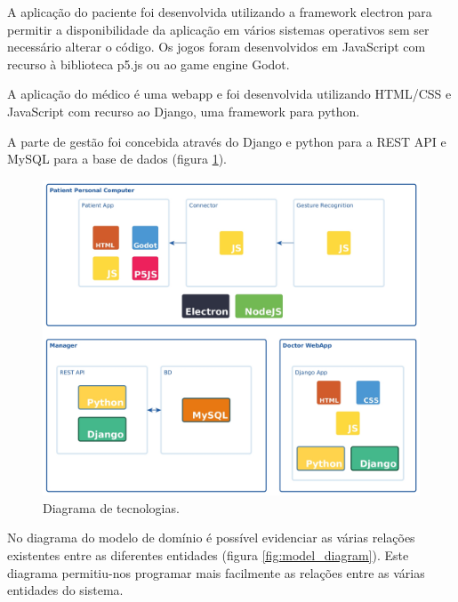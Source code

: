 \documentclass{TTUPhD}
\begin{document}
A aplicação do paciente foi desenvolvida utilizando a framework electron para permitir a disponibilidade da aplicação em vários sistemas operativos sem ser necessário
alterar o código.
Os jogos foram desenvolvidos em JavaScript com recurso à biblioteca p5.js ou ao game engine Godot.

A aplicação do médico é uma webapp e foi desenvolvida utilizando HTML/CSS e JavaScript com recurso ao Django, uma framework para python.

A parte de gestão foi concebida através do Django e python para a REST API e MySQL para a base de dados (figura \ref{fig:tech_diagram}).

\begin{figure}[h!]
    \center
    \includegraphics[scale=0.15]{./img/technological.jpg}
    \caption{Diagrama de tecnologias.}
    \label{fig:tech_diagram}
\end{figure}

No diagrama do modelo de domínio é possível evidenciar as várias relações existentes entre as diferentes entidades (figura \ref{fig:model_diagram}).
Este diagrama permitiu-nos programar mais facilmente as relações entre as várias entidades do sistema.
\end{document}
